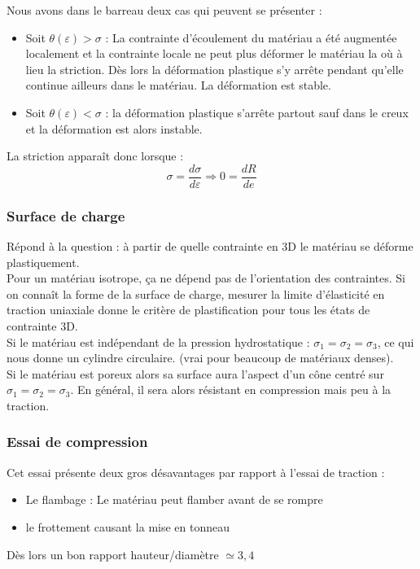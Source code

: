 \documentclass[../main.tex]{subfiles}
\begin{document}
Nous avons dans le barreau deux cas qui peuvent se présenter : \\
\begin{itemize}
    \item Soit $ \theta(\varepsilon) > \sigma$ : La contrainte d'écoulement du matériau a été augmentée localement et la contrainte locale ne peut plus déformer le matériau la où à lieu la striction. Dès lors la déformation plastique s'y arrête pendant qu'elle continue ailleurs dans le matériau. La déformation est stable.\\
    \item Soit $ \theta(\varepsilon) < \sigma$ : la déformation plastique s'arrête partout sauf dans le creux et la déformation est alors instable.\\
\end{itemize}

La striction apparaît donc lorsque : \begin{equation}
    \sigma = \frac{d\sigma}{d\varepsilon} \Rightarrow 0 = \frac{dR}{de}
\end{equation}


\subsubsection{Surface de charge}
Répond à la question : à partir de quelle contrainte en 3D le matériau se déforme plastiquement.\\
Pour un matériau isotrope, ça ne dépend pas de l'orientation des contraintes. Si on connaît la forme de la surface de charge, mesurer la limite d'élasticité en traction uniaxiale donne le critère de plastification pour tous les états de contrainte 3D.\\

Si le matériau est indépendant de la pression hydrostatique : $\sigma_1 = \sigma_2 = \sigma_3$, ce qui nous donne un cylindre circulaire. (vrai pour beaucoup de matériaux denses).\\
Si le matériau est poreux alors sa surface aura l'aspect d'un cône centré sur $\sigma_1 = \sigma_2 = \sigma_3$. En général, il sera alors résistant en compression mais peu à la traction.\\

\subsubsection{Essai de compression}
Cet essai présente deux gros désavantages par rapport à l'essai de traction : \\
\begin{itemize}
    \item Le flambage : Le matériau peut flamber avant de se rompre\\
    \item le frottement causant la mise en tonneau\\
\end{itemize}
Dès lors un bon rapport hauteur/diamètre $\simeq 3,4$
\end{document}
